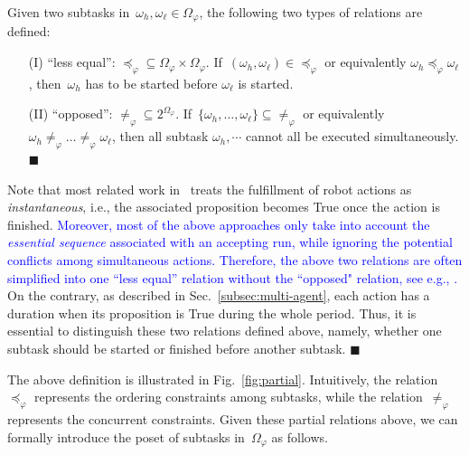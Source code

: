 \begin{definition}\label{def:partial}
Given two subtasks in~$\omega_h,
\omega_\ell\in \Omega_{\varphi}$,
the following two types of relations are defined:
\begin{itemize}
\item[(I)] ``less equal'': $\preceq_{\varphi}\subseteq \Omega_{\varphi} \times \Omega_{\varphi}$.
If~$(\omega_h, \omega_\ell)\in \preceq_{\varphi}$ or
equivalently $\omega_h\preceq_{\varphi}\omega_\ell$,
then~$\omega_h$ has to be {started} before $\omega_\ell$ is started.
\item[(II)] ``opposed'': $\neq_{\varphi}\subseteq 2^{\Omega_{\varphi}}$.
If~$\{\omega_h,\dots,\omega_\ell\}\subseteq \neq_{\varphi}$
or equivalently $\omega_h\neq_{\varphi}\dots\neq_{\varphi}\omega_\ell$,
then all subtask $\omega_h,\cdots$ cannot all be {executed} simultaneously.
\hfill $\blacksquare$
\end{itemize}
\end{definition}

\begin{remark}\label{remark:duration}
Note that most related work in~\citep{kantaros2020stylus, guo2015multi,
tumova2016multi, luo2021abstraction,luo2021temporal, sahin2019multirobot, jones2019scratchs}
treats the fulfillment of robot actions as \emph{instantaneous},
i.e., the associated proposition becomes True once the action is finished.
\textcolor{blue}{
  Moreover, most of the above approaches only take into account the \emph{essential sequence}
\citep{2016Decomposition}
associated with an accepting run, while ignoring the potential conflicts
among simultaneous actions. Therefore, the above two relations
are often simplified into one ``less equal'' relation without the ``opposed" relation,
see e.g., \citep{luo2021temporal}.}
On the contrary, as described in Sec.~\ref{subsec:multi-agent},
each action has a duration when its proposition is True during the {whole} period.
Thus, it is essential to distinguish these two relations defined above,
namely, whether one subtask should be started or finished before another subtask.
\hfill  $\blacksquare$
\end{remark}


The above definition is illustrated in Fig.~\ref{fig:partial}.
Intuitively, the relation~$\preceq_{\varphi}$ represents the ordering
constraints among subtasks,
while the relation~$\neq_{\varphi}$ represents the concurrent constraints.
Given these partial relations above, we can formally introduce the poset of subtasks in~$\Omega_{\varphi}$ as follows.


